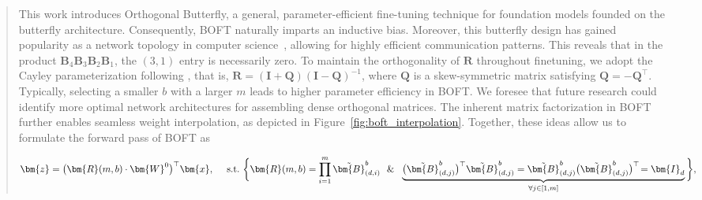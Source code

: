 \begin{abstract}
This work introduces Orthogonal Butterfly, a general, parameter-efficient fine-tuning technique for foundation models founded on the butterfly architecture. Consequently, BOFT naturally imparts an inductive bias. Moreover, this butterfly design has gained popularity as a network topology in computer science~\cite{solihin2015fundamentals,li2011linear}, allowing for highly efficient communication patterns. This reveals that in the product $\bm{B}_4\bm{B}_3\bm{B}_2\bm{B}_1$, the $(3,1)$ entry is necessarily zero. To maintain the orthogonality of $\bm{R}$ throughout finetuning, we adopt the Cayley parameterization following \cite{qiu2023controlling,liu2021orthogonal}, that is, $\bm{R}=(\bm{I}+\bm{Q})(\bm{I}-\bm{Q})^{-1}$, where $\bm{Q}$ is a skew-symmetric matrix satisfying $\bm{Q}=-\bm{Q}^\top$. Typically, selecting a smaller $b$ with a larger $m$ leads to higher parameter efficiency in BOFT. We foresee that future research could identify more optimal network architectures for assembling dense orthogonal matrices. The inherent matrix factorization in BOFT further enables seamless weight interpolation, as depicted in Figure~\ref{fig:boft_interpolation}. Together, these ideas allow us to formulate the forward pass of BOFT as

\begin{equation}
    \begin{aligned}\nonumber
    \bm{z}=\big(\bm{R}(m,b)\cdot\bm{W}^0\big)^\top\bm{x},~~~~\text{s.t.}~\bigg{\{}\bm{R}(m,b)=\prod_{i=1}^m \tilde{\bm{B}}^b_{(d,i)}~~\&~~\underbrace{\big(\tilde{\bm{B}}^b_{(d,j)}\big)^\top\tilde{\bm{B}}^b_{(d,j)}=\tilde{\bm{B}}^b_{(d,j)}\big(\tilde{\bm{B}}^b_{(d,j)}\big)^\top\!=\bm{I}_d}_{\forall j\in [1, m]}\bigg{\}},
    \end{aligned}
\end{equation}


\end{abstract}
